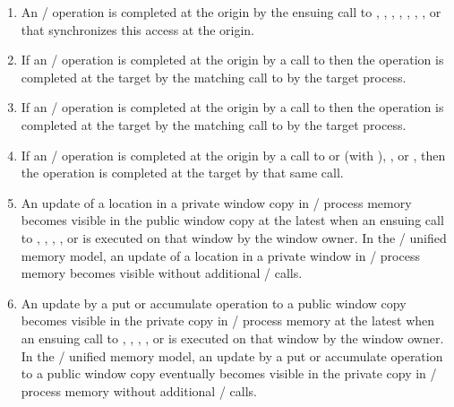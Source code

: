 \begin{enumerate}
\item
\label{rma:rule:atorigin}
An \RMA/ operation is completed at the origin
by the ensuing call to
, , ,
, ,\flushline
{}, , or
that synchronizes this access at the origin.
\item
\label{rma:rule:fenceattarget}
If an \RMA/ operation is completed at the origin by a call to
then the operation is completed at the target  by the
matching call to  by the target process.
\item
\label{rma:rule:completewait}
If an \RMA/ operation is completed at the origin
by a call to 
then the operation is completed at the target  by the
matching call to   by the target process.
\item
\label{rma:rule:unlockcomplete}
If an \RMA/ operation is completed at the origin by a call to
 or  (with ), , or ,
then the operation is completed at the target by
that same call.
\item
\label{rma:rule:unlockprivate}
An update of a location in a private window copy in \mpi/ process memory
becomes visible in the public window copy at the latest when an ensuing call
to , , , 
, or  is
executed on that window by the window owner. In the \RMA/ unified
memory model, an update of a location in a private window in \mpi/ process
memory becomes visible without additional \RMA/ calls.

\item
An update by a put or accumulate operation to a public window copy becomes
visible in the private copy in \mpi/ process memory at the latest when an ensuing
call to , , , 
, or  is executed on that window by the
window owner. In the \RMA/ unified memory model, an update by a put or
accumulate operation to a public window copy eventually becomes visible in the private
copy in \mpi/ process memory without additional \RMA/ calls.
\label{rma:rule:updatetoprivate}
\end{enumerate}

